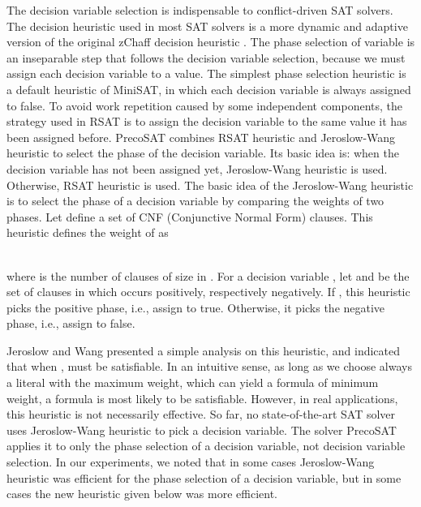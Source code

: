 \documentclass{llncs}
\begin{document}
The decision variable selection is indispensable to conflict-driven
SAT solvers. The decision heuristic used in most SAT solvers is a
more dynamic and adaptive version of the original zChaff decision
heuristic \cite {CDCL:16}. The phase selection of variable is an
inseparable step that follows the decision variable selection,
because we must assign each decision variable to a value. The
simplest phase selection heuristic is a default heuristic of
MiniSAT, in which each decision variable is always assigned to
false. To avoid work repetition caused by some independent
components, the strategy used in RSAT \cite{RsatHeuris:1,Rsat:6} is
to assign the decision variable to the same value it has been
assigned before. PrecoSAT \cite{Precosat10:5} combines RSAT
heuristic \cite{RsatHeuris:1} and Jeroslow-Wang heuristic
\cite{JWheuris:2} to select the phase of the decision variable. Its
basic idea is: when the decision variable has not been assigned yet,
Jeroslow-Wang heuristic is used. Otherwise, RSAT heuristic is used.
The basic idea of the Jeroslow-Wang heuristic is to select the phase
of a decision variable by comparing the weights of two phases. Let
 define a set of CNF (Conjunctive Normal Form) clauses. This
heuristic defines the weight of  as

\hskip 10mm  \\
where  is the number of clauses of size  in . For a
decision variable , let  and  be the set of clauses
in which  occurs positively, respectively negatively. If , this heuristic picks the positive phase, i.e., assign
 to true. Otherwise, it picks the negative phase, i.e., assign
 to false.

Jeroslow and Wang \cite{JWheuris:2} presented a simple analysis on
this heuristic, and indicated that when ,  must be
satisfiable. In an intuitive sense, as long as we choose always a
literal with the maximum weight, which can yield a formula of
minimum weight, a formula is most likely to be satisfiable. However,
in real applications, this heuristic is not necessarily effective.
So far, no state-of-the-art SAT solver uses Jeroslow-Wang heuristic
to pick a decision variable. The solver PrecoSAT applies it to only
the phase selection of a decision variable, not decision variable
selection. In our experiments, we noted that in some cases
Jeroslow-Wang heuristic was efficient for the phase selection of a
decision variable, but in some cases the new heuristic given below
was more efficient.
\end{document}
